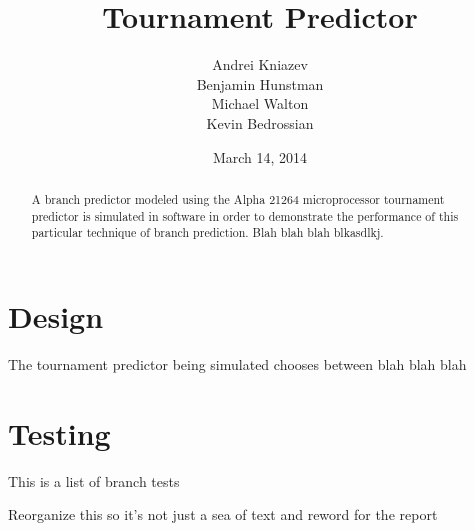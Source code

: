 \documentclass[]{report}   %
\begin{document}
\raggedright{}  %

\title{Tournament Predictor}   %
\author{Andrei Kniazev\\
  Benjamin Hunstman\\
  Michael Walton\\
  Kevin Bedrossian\\
}         %
\date{March 14, 2014}    %
\maketitle

\begin{abstract}
  A branch predictor modeled using the Alpha 21264 microprocessor tournament predictor is simulated in software in order to demonstrate the performance of this particular technique of branch prediction. Blah blah blah blkasdlkj.
\end{abstract}

\tableofcontents

\chapter{Design}
The tournament predictor being simulated chooses between blah blah blah

\chapter{Testing}
This is a list of branch tests

Reorganize this so it's not just a sea of text and reword for the report\cite{kessler}
\end{document}
